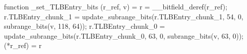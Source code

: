 function _set_TLBEntry_bits (r_ref, v) = {
    r = __bitfield_deref(r_ref);
    r.TLBEntry_chunk_1 = update_subrange_bits(r.TLBEntry_chunk_1, 54, 0, subrange_bits(v, 118, 64));
    r.TLBEntry_chunk_0 = update_subrange_bits(r.TLBEntry_chunk_0, 63, 0, subrange_bits(v, 63, 0));
    (*r_ref) = r
}
